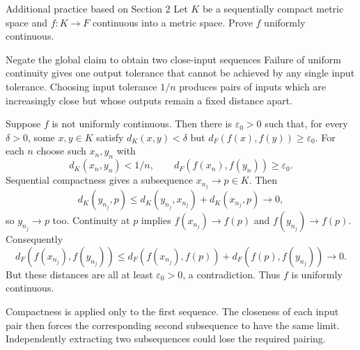 \begin{exam}{Additional practice based on Section 2}
Let $K$ be a sequentially compact metric space and $f:K\to F$ continuous into a metric space. Prove $f$ uniformly continuous.
\end{exam}
\begin{method}{Negate the global claim to obtain two close-input sequences}
Failure of uniform continuity gives one output tolerance that cannot be achieved by any single input tolerance. Choosing input tolerance $1/n$ produces pairs of inputs which are increasingly close but whose outputs remain a fixed distance apart.
\end{method}
\begin{answer}
Suppose $f$ is not uniformly continuous. Then there is $\varepsilon_0>0$ such that, for every $\delta>0$, some $x,y\in K$ satisfy $d_K(x,y)<\delta$ but $d_F(f(x),f(y))\ge\varepsilon_0$. For each $n$ choose such $x_n,y_n$ with
\[d_K(x_n,y_n)<1/n,\qquad d_F(f(x_n),f(y_n))\ge\varepsilon_0.\]
Sequential compactness gives a subsequence $x_{n_j}\to p\in K$. Then
\[d_K(y_{n_j},p)\le d_K(y_{n_j},x_{n_j})+d_K(x_{n_j},p)\to0,\]
so $y_{n_j}\to p$ too. Continuity at $p$ implies $f(x_{n_j})\to f(p)$ and $f(y_{n_j})\to f(p)$. Consequently
\[d_F(f(x_{n_j}),f(y_{n_j}))\le d_F(f(x_{n_j}),f(p))+d_F(f(p),f(y_{n_j}))\to0.\]
But these distances are all at least $\varepsilon_0>0$, a contradiction. Thus $f$ is uniformly continuous.
\end{answer}
\begin{tip}
Compactness is applied only to the first sequence. The closeness of each input pair then forces the corresponding second subsequence to have the same limit. Independently extracting two subsequences could lose the required pairing.
\end{tip}


